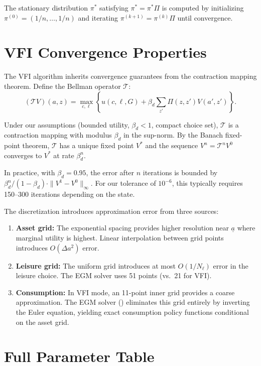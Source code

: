 \documentclass[12pt]{article}
\begin{document}
The stationary distribution $\pi^*$ satisfying $\pi^* = \pi^* \Pi$ is computed by initializing $\pi^{(0)} = (1/n, \ldots, 1/n)$ and iterating $\pi^{(k+1)} = \pi^{(k)} \Pi$ until convergence.


\section{VFI Convergence Properties}\label{app:vfi}

The VFI algorithm inherits convergence guarantees from the contraction mapping theorem. Define the Bellman operator $\mathcal{T}$:
\begin{equation}
  (\mathcal{T}V)(a, z) = \max_{c, \ell} \left\{ u(c, \ell, G) + \beta_d \sum_{z'} \Pi(z, z') V(a', z') \right\}.
\end{equation}

Under our assumptions (bounded utility, $\beta_d < 1$, compact choice set), $\mathcal{T}$ is a contraction mapping with modulus $\beta_d$ in the sup-norm. By the Banach fixed-point theorem, $\mathcal{T}$ has a unique fixed point $V^*$ and the sequence $V^n = \mathcal{T}^n V^0$ converges to $V^*$ at rate $\beta_d^n$.

In practice, with $\beta_d = 0.95$, the error after $n$ iterations is bounded by $\beta_d^n / (1 - \beta_d) \cdot \|V^1 - V^0\|_\infty$. For our tolerance of $10^{-6}$, this typically requires 150--300 iterations depending on the state.

The discretization introduces approximation error from three sources:
\begin{enumerate}
  \item \textbf{Asset grid:} The exponential spacing provides higher resolution near $\underline{a}$ where marginal utility is highest. Linear interpolation between grid points introduces $O(\Delta a^2)$ error.
  \item \textbf{Leisure grid:} The uniform grid introduces at most $O(1/N_\ell)$ error in the leisure choice. The EGM solver uses 51 points (vs.\ 21 for VFI).
  \item \textbf{Consumption:} In VFI mode, an 11-point inner grid provides a coarse approximation. The EGM solver () eliminates this grid entirely by inverting the Euler equation, yielding exact consumption policy functions conditional on the asset grid.
\end{enumerate}


\section{Full Parameter Table}\label{app:params}
\end{document}
